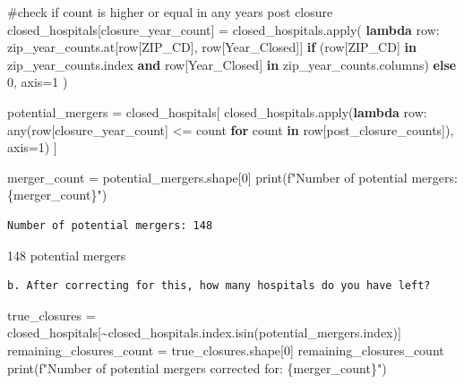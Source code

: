 \documentclass[
  letterpaper,
  DIV=11,
  numbers=noendperiod]{scrartcl}
\newenvironment{Shaded}{\begin{snugshade}}{\end{snugshade}}
\newcommand{\BuiltInTok}[1]{\textcolor[rgb]{0.00,0.23,0.31}{#1}}
\newcommand{\CommentTok}[1]{\textcolor[rgb]{0.37,0.37,0.37}{#1}}
\newcommand{\ControlFlowTok}[1]{\textcolor[rgb]{0.00,0.23,0.31}{\textbf{#1}}}
\newcommand{\DecValTok}[1]{\textcolor[rgb]{0.68,0.00,0.00}{#1}}
\newcommand{\KeywordTok}[1]{\textcolor[rgb]{0.00,0.23,0.31}{\textbf{#1}}}
\newcommand{\NormalTok}[1]{\textcolor[rgb]{0.00,0.23,0.31}{#1}}
\newcommand{\OperatorTok}[1]{\textcolor[rgb]{0.37,0.37,0.37}{#1}}
\newcommand{\SpecialCharTok}[1]{\textcolor[rgb]{0.37,0.37,0.37}{#1}}
\newcommand{\SpecialStringTok}[1]{\textcolor[rgb]{0.13,0.47,0.30}{#1}}
\newcommand{\StringTok}[1]{\textcolor[rgb]{0.13,0.47,0.30}{#1}}
\begin{document}
\begin{Shaded}
\begin{Highlighting}[]
\CommentTok{\#check if count is higher or equal in any years post closure}
\NormalTok{closed\_hospitals[}\StringTok{\textquotesingle{}closure\_year\_count\textquotesingle{}}\NormalTok{] }\OperatorTok{=}\NormalTok{ closed\_hospitals.}\BuiltInTok{apply}\NormalTok{(}
    \KeywordTok{lambda}\NormalTok{ row: zip\_year\_counts.at[row[}\StringTok{\textquotesingle{}ZIP\_CD\textquotesingle{}}\NormalTok{], row[}\StringTok{\textquotesingle{}Year\_Closed\textquotesingle{}}\NormalTok{]]}
    \ControlFlowTok{if}\NormalTok{ (row[}\StringTok{\textquotesingle{}ZIP\_CD\textquotesingle{}}\NormalTok{] }\KeywordTok{in}\NormalTok{ zip\_year\_counts.index }\KeywordTok{and}\NormalTok{ row[}\StringTok{\textquotesingle{}Year\_Closed\textquotesingle{}}\NormalTok{] }\KeywordTok{in}\NormalTok{ zip\_year\_counts.columns) }\ControlFlowTok{else} \DecValTok{0}\NormalTok{, axis}\OperatorTok{=}\DecValTok{1}
\NormalTok{)}

\NormalTok{potential\_mergers }\OperatorTok{=}\NormalTok{ closed\_hospitals[}
\NormalTok{    closed\_hospitals.}\BuiltInTok{apply}\NormalTok{(}\KeywordTok{lambda}\NormalTok{ row: }\BuiltInTok{any}\NormalTok{(row[}\StringTok{\textquotesingle{}closure\_year\_count\textquotesingle{}}\NormalTok{] }\OperatorTok{\textless{}=}\NormalTok{ count }\ControlFlowTok{for}\NormalTok{ count }\KeywordTok{in}\NormalTok{ row[}\StringTok{\textquotesingle{}post\_closure\_counts\textquotesingle{}}\NormalTok{]), axis}\OperatorTok{=}\DecValTok{1}\NormalTok{)}
\NormalTok{]}

\NormalTok{merger\_count }\OperatorTok{=}\NormalTok{ potential\_mergers.shape[}\DecValTok{0}\NormalTok{]}
\BuiltInTok{print}\NormalTok{(}\SpecialStringTok{f"Number of potential mergers: }\SpecialCharTok{\{}\NormalTok{merger\_count}\SpecialCharTok{\}}\SpecialStringTok{"}\NormalTok{)}
\end{Highlighting}
\end{Shaded}

\begin{verbatim}
Number of potential mergers: 148
\end{verbatim}

148 potential mergers

\begin{verbatim}
b. After correcting for this, how many hospitals do you have left?
\end{verbatim}

\begin{Shaded}
\begin{Highlighting}[]
\NormalTok{true\_closures }\OperatorTok{=}\NormalTok{ closed\_hospitals[}\OperatorTok{\textasciitilde{}}\NormalTok{closed\_hospitals.index.isin(potential\_mergers.index)]}
\NormalTok{remaining\_closures\_count }\OperatorTok{=}\NormalTok{ true\_closures.shape[}\DecValTok{0}\NormalTok{]}
\NormalTok{remaining\_closures\_count}
\BuiltInTok{print}\NormalTok{(}\SpecialStringTok{f"Number of potential mergers corrected for: }\SpecialCharTok{\{}\NormalTok{merger\_count}\SpecialCharTok{\}}\SpecialStringTok{"}\NormalTok{)}
\end{Highlighting}
\end{Shaded}
\end{document}
